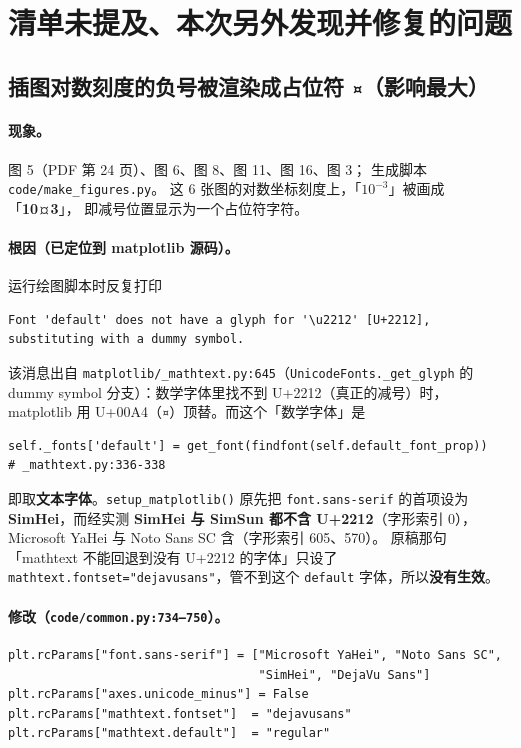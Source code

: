 \documentclass[11pt,a4paper]{ctexart}
\newcommand{\src}[1]{\texttt{#1}}
\newcommand{\loc}[1]{\textcolor{blue!60!black}{#1}}
\begin{document}
\section{清单未提及、本次另外发现并修复的问题}

\subsection{插图对数刻度的负号被渲染成占位符 \texttt{¤}（影响最大）}

\paragraph{现象。}\loc{图 5（PDF 第 24 页）、图 6、图 8、图 11、图 16、图 3；
生成脚本 \src{code/make\_figures.py}}。
这 6 张图的对数坐标刻度上，「$10^{-3}$」被画成「\textbf{10¤3}」，
即减号位置显示为一个占位符字符。

\paragraph{根因（已定位到 matplotlib 源码）。}
运行绘图脚本时反复打印
\begin{lstlisting}
Font 'default' does not have a glyph for '\u2212' [U+2212], substituting with a dummy symbol.
\end{lstlisting}
该消息出自 \src{matplotlib/\_mathtext.py:645}（\src{UnicodeFonts.\_get\_glyph} 的
dummy symbol 分支）：数学字体里找不到 U+2212（真正的减号）时，
matplotlib 用 U+00A4（\texttt{¤}）顶替。而这个「数学字体」是
\begin{lstlisting}
self._fonts['default'] = get_font(findfont(self.default_font_prop))   # _mathtext.py:336-338
\end{lstlisting}
即取\textbf{文本字体}。\src{setup\_matplotlib()} 原先把
\src{font.sans-serif} 的首项设为 \textbf{SimHei}，而经实测
\textbf{SimHei 与 SimSun 都不含 U+2212}（字形索引 0），
Microsoft YaHei 与 Noto Sans SC 含（字形索引 605、570）。
原稿那句「mathtext 不能回退到没有 U+2212 的字体」只设了
\src{mathtext.fontset="dejavusans"}，管不到这个 \src{default} 字体，所以\textbf{没有生效}。

\paragraph{修改（\src{code/common.py:734--750}）。}
\begin{lstlisting}[style=new]
plt.rcParams["font.sans-serif"] = ["Microsoft YaHei", "Noto Sans SC",
                                   "SimHei", "DejaVu Sans"]
plt.rcParams["axes.unicode_minus"] = False
plt.rcParams["mathtext.fontset"]  = "dejavusans"
plt.rcParams["mathtext.default"]  = "regular"
\end{lstlisting}
\end{document}
